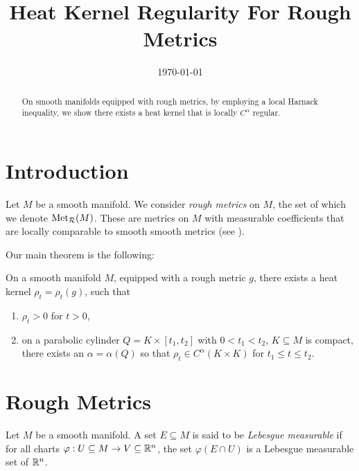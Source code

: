 \documentclass{amsart}
\begin{document}
\title[Heat Kernel Regularity]
 {Heat Kernel Regularity For Rough Metrics}

\curraddr{}
\email{}
\date{\today}

\dedicatory{}
\subjclass[2010]{}
\keywords{}

\begin{abstract}
On smooth manifolds equipped with rough metrics, by employing a local Harnack inequality, we show there exists a heat kernel that is locally $C^{\alpha}$ regular.
\end{abstract}

\maketitle

\section{Introduction}
\label{sec:intro}

Let \(M\) be a smooth manifold. We consider \emph{rough metrics} on \(M\), the set of which we denote \(\operatorname{Met}_{\operatorname{\mathcal{R}}} (M)\). These are metrics on \(M\) with measurable coefficients that are locally comparable to smooth smooth metrics (see ).

Our main theorem is the following:

\begin{thm}
On a smooth manifold \(M\), equipped with a rough metric \(g\), there exists a heat kernel \(\rho_t = \rho_t(g)\), such that
\begin{enumerate}
\item \(\rho_t > 0\) for \(t > 0\),
\item on a parabolic cylinder \(Q = K \times [t_1, t_2]\) with \(0 < t_1 < t_2\), \(K \subseteq M\) is compact, there exists an \(\alpha = \alpha(Q)\) so that \(\rho_t \in C^{\alpha}(K \times K)\) for \(t_1 \leq t \leq t_2\).
\end{enumerate}
\end{thm}

\section{Rough Metrics}
\label{sec:rough_metrics}

\begin{defn}
Let \(M\) be a smooth manifold. A set \(E \subseteq M\) is said to be \emph{Lebesgue measurable} if for all charts \(\varphi : U \subseteq M \to V \subseteq \mathbb{R}^n\), the set \(\varphi(E \cap U)\) is a Lebesgue measurable set of \(\mathbb{R}^n\).
\end{defn}
\end{document}

